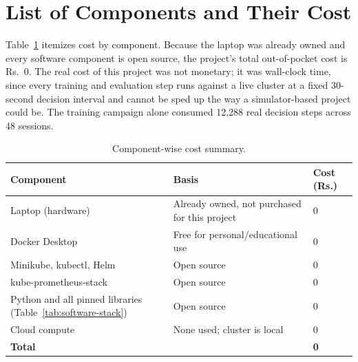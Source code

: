\section{List of Components and Their Cost}
\label{sec:cost-components}

Table~\ref{tab:cost-total} itemizes cost by component. Because the laptop
was already owned and every software component is open source, the
project's total out-of-pocket cost is Rs.~0. The real cost of this project
was not monetary; it was wall-clock time, since every training and
evaluation step runs against a live cluster at a fixed 30-second decision
interval and cannot be sped up the way a simulator-based project could be.
The training campaign alone consumed 12,288 real decision steps across 48
sessions.

\begin{table}[H]
\centering
\caption{Component-wise cost summary.}
\label{tab:cost-total}
\begin{tabular}{p{4.3cm}p{8.5cm}p{1.6cm}}
\toprule
Component & Basis & Cost (Rs.) \\
\midrule
Laptop (hardware) & Already owned, not purchased for this project & 0 \\
Docker Desktop & Free for personal/educational use & 0 \\
Minikube, kubectl, Helm & Open source & 0 \\
kube-prometheus-stack & Open source & 0 \\
Python and all pinned libraries (Table~\ref{tab:software-stack}) & Open source & 0 \\
Cloud compute & None used; cluster is local & 0 \\
\midrule
\textbf{Total} & & \textbf{0} \\
\bottomrule
\end{tabular}
\end{table}
